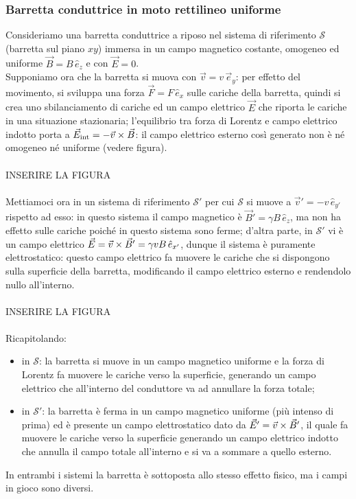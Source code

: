 \documentclass[]{article}
\begin{document}
\subsubsection{Barretta conduttrice in moto rettilineo uniforme}

Consideriamo una barretta conduttrice a riposo nel sistema di riferimento $ \mathcal{S} $ (barretta sul piano $ xy $) immersa in un campo magnetico costante, omogeneo ed uniforme $ \vec{B} = B\,\hat{e}_z $ e con $ \vec{E} = 0 $. \\ 
%
Supponiamo ora che la barretta si muova con $ \vec{v} = v \,\vec{e}_y $: per effetto del movimento, si sviluppa una forza $ \vec{F} = F \,\hat{e}_x $ sulle cariche della barretta, quindi si crea uno sbilanciamento di cariche ed un campo elettrico $ \vec{E} $ che riporta le cariche in una situazione stazionaria; l'equilibrio tra forza di Lorentz e campo elettrico indotto porta a $ \vec{E}_{\text{int}} = -\vec{v}\times\vec{B} $: il campo elettrico esterno così generato non è né omogeneo né uniforme (vedere figura). \\ 
%
%
%
\hbox{} \\ INSERIRE LA FIGURA \\ \hbox{} \\ 
%
%
%
Mettiamoci ora in un sistema di riferimento $ \mathcal{S}' $ per cui $ \mathcal{S} $ si muove a $ \vec{v}' = -v\,\hat{e}_{y'} $ rispetto ad esso: in questo sistema il campo magnetico è $ \vec{B}' = \gamma B \,\hat{e}_z $, ma non ha effetto sulle cariche poiché in questo sistema sono ferme; d'altra parte, in $ \mathcal{S}' $ vi è un campo elettrico $ \vec{E} = \vec{v}\times\vec{B}' = \gamma vB \,\hat{e}_{x'} $, dunque il sistema è puramente elettrostatico: questo campo elettrico fa muovere le cariche che si dispongono sulla superficie della barretta, modificando il campo elettrico esterno e rendendolo nullo all'interno. \\ 
%
%
%
\hbox{} \\ INSERIRE LA FIGURA \\ \hbox{} \\ 
%
%
%
Ricapitolando:
\begin{itemize}
	\item in $ \mathcal{S} $: la barretta si muove in un campo magnetico uniforme e la forza di Lorentz fa muovere le cariche verso la superficie, generando un campo elettrico che all'interno del conduttore va ad annullare la forza totale;
	\item in $ \mathcal{S}' $: la barretta è ferma in un campo magnetico uniforme (più intenso di prima) ed è presente un campo elettrostatico dato da $ \vec{E}' = \vec{v}\times\vec{B}' $, il quale fa muovere le cariche verso la superficie generando un campo elettrico indotto che annulla il campo totale all'interno e si va a sommare a quello esterno.
\end{itemize}
In entrambi i sistemi la barretta è sottoposta allo stesso effetto fisico, ma i campi in gioco sono diversi.
\end{document}
